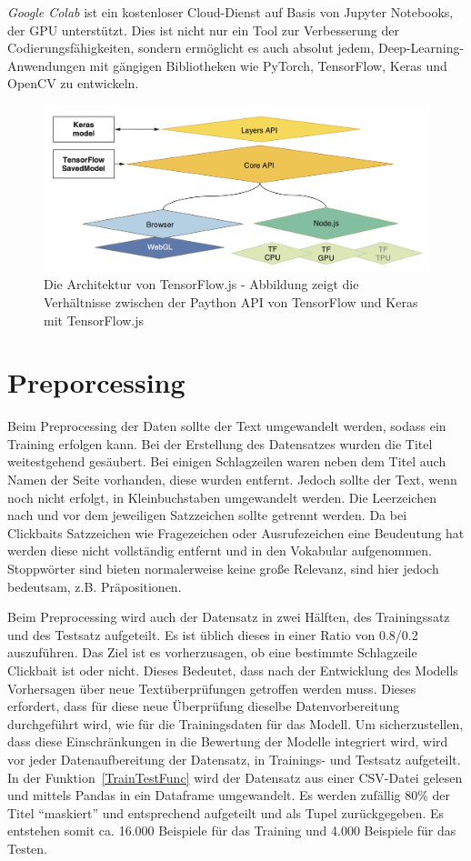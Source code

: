 \textit{Google Colab} ist ein kostenloser Cloud-Dienst auf Basis von Jupyter Notebooks, der GPU unterstützt. Dies ist nicht nur ein  Tool zur Verbesserung der Codierungsfähigkeiten, sondern ermöglicht es auch absolut jedem, Deep-Learning-Anwendungen mit gängigen Bibliotheken wie PyTorch, TensorFlow, Keras und OpenCV zu entwickeln.

 \begin{figure}[H]
     \centering
     \includegraphics[width=12cm]{kapitel5/tfjsarch.png}
     \caption[Die Architektur von TensorFlow.js]{Die Architektur von TensorFlow.js - Abbildung zeigt die Verhältnisse zwischen der Paython API von TensorFlow und Keras mit TensorFlow.js}
     \label{Kap5:tfjsarch}
 \end{figure}

\section{Preporcessing}
Beim Preprocessing der Daten sollte der Text umgewandelt werden, sodass ein Training erfolgen kann. Bei der Erstellung des Datensatzes wurden die Titel weitestgehend gesäubert. Bei einigen Schlagzeilen waren neben dem Titel auch Namen der Seite vorhanden, diese wurden entfernt. Jedoch sollte der Text, wenn noch nicht erfolgt, in Kleinbuchstaben umgewandelt werden. Die Leerzeichen nach und vor dem jeweiligen Satzzeichen sollte getrennt werden. Da bei Clickbaits Satzzeichen wie Fragezeichen oder Ausrufezeichen eine Beudeutung hat werden diese nicht vollständig entfernt und in den Vokabular aufgenommen. Stoppwörter sind bieten normalerweise keine große Relevanz, sind hier jedoch bedeutsam, z.B. Präpositionen.

Beim Preprocessing wird auch der Datensatz in zwei Hälften, des Trainingssatz und des Testsatz aufgeteilt. Es ist üblich dieses in einer Ratio von 0.8/0.2 auszuführen. Das Ziel ist es vorherzusagen, ob eine bestimmte Schlagzeile Clickbait ist oder nicht. Dieses Bedeutet, dass nach der Entwicklung des Modells Vorhersagen über neue Textüberprüfungen getroffen werden muss. Dieses erfordert, dass für diese neue Überprüfung dieselbe Datenvorbereitung durchgeführt wird, wie für die Trainingsdaten für das Modell. Um sicherzustellen, dass diese Einschränkungen in die Bewertung der Modelle integriert wird, wird vor jeder Datenaufbereitung der Datensatz, in Trainings- und Testsatz aufgeteilt. In der Funktion~\ref{TrainTestFunc} wird der Datensatz aus einer CSV-Datei gelesen und mittels Pandas in ein Dataframe umgewandelt. Es werden zufällig 80\% der Titel \enquote{maskiert} und entsprechend aufgeteilt und als Tupel zurückgegeben. Es entstehen somit ca. 16.000 Beispiele für das Training und 4.000 Beispiele für das Testen.


